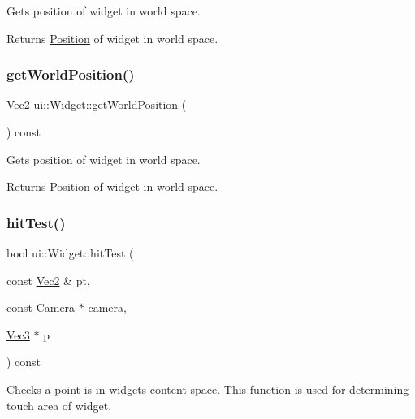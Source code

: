 Gets position of widget in world space.

\begin{DoxyReturn}{Returns}
\hyperlink{structPosition}{Position} of widget in world space. 
\end{DoxyReturn}
\mbox{\label{classui_1_1Widget_a312cec82d35501ebb0431ddf780dac07}} 
\subsubsection{\texorpdfstring{get\+World\+Position()}{getWorldPosition()}\hspace{0.1cm}{\footnotesize\ttfamily [2/2]}}
{\footnotesize\ttfamily \hyperlink{classVec2}{Vec2} ui\+::\+Widget\+::get\+World\+Position (\begin{DoxyParamCaption}{ }\end{DoxyParamCaption}) const}

Gets position of widget in world space.

\begin{DoxyReturn}{Returns}
\hyperlink{structPosition}{Position} of widget in world space. 
\end{DoxyReturn}
\mbox{\label{classui_1_1Widget_ab44cccca898684bd50944575ce9d8ab3}} 
\subsubsection{\texorpdfstring{hit\+Test()}{hitTest()}\hspace{0.1cm}{\footnotesize\ttfamily [1/2]}}
{\footnotesize\ttfamily bool ui\+::\+Widget\+::hit\+Test (\begin{DoxyParamCaption}\item[{const \hyperlink{classVec2}{Vec2} \&}]{pt,  }\item[{const \hyperlink{classCamera}{Camera} $\ast$}]{camera,  }\item[{\hyperlink{classVec3}{Vec3} $\ast$}]{p }\end{DoxyParamCaption}) const\hspace{0.3cm}{\ttfamily [virtual]}}

Checks a point is in widget\textquotesingle{}s content space. This function is used for determining touch area of widget.


